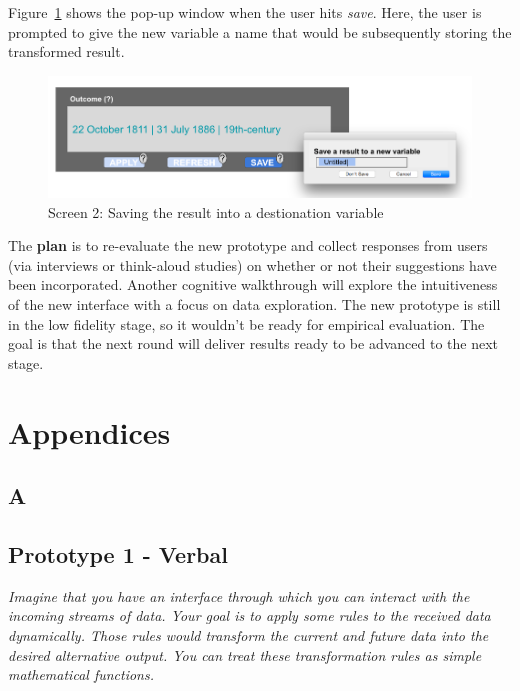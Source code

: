 \documentclass[12pt,letterpaper]{article}
\begin{document}
Figure~\ref{fig::3} shows the pop-up window when the user hits \textit{save}. Here, the user is prompted to give the new variable a name that would be subsequently storing the transformed result.


\begin{figure}[h]
\centering
\includegraphics[scale=.3]{figures/m3/interface_resdesign_screen3.png}
\caption{Screen 2: Saving the result into a destionation variable}
\label{fig::3}
\end{figure}

The \textbf{plan} is to re-evaluate the new prototype and collect responses from users (via interviews or think-aloud studies) on whether or not their suggestions have been incorporated. Another cognitive walkthrough will explore the intuitiveness of the new interface with a focus on data exploration. The new prototype is still in the low fidelity stage, so it wouldn't be ready for empirical evaluation. The goal is that the next round will deliver results ready to be advanced to the next stage.


\newpage
\section*{Appendices}

\appendix


\subsection*{A}

\subsection*{Prototype 1 - Verbal}

\textit{Imagine that you have an interface through which you can interact with the incoming streams of data. Your goal is to apply some rules to the received data dynamically. Those rules would transform the current and future data into the desired alternative output. You can treat these transformation rules as simple mathematical functions.}
\end{document}
